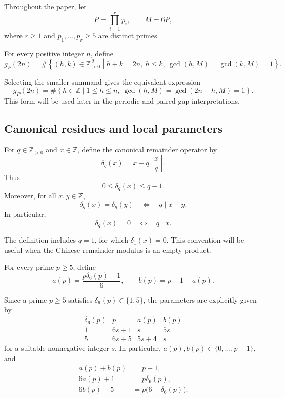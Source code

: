 \documentclass[12pt]{article}
\numberwithin{equation}{section}
\theoremstyle{definition}
\theoremstyle{remark}
\newcommand{\Z}{\mathbb Z}
\begin{document}
Throughout the paper, let
\[
P=\prod_{i=1}^{r}p_i,
\qquad
M=6P,
\]
where $r\geq1$ and $p_1,\dots,p_r\geq5$ are distinct primes.

For every positive integer $n$, define
\begin{equation}
\label{eq:g-definition}
g_P(2n)
=
\#\left\{
(h,k)\in\Z_{>0}^{\,2}
\mathrel{}\middle|\mathrel{}
h+k=2n,\ 
h\leq k,\ 
\gcd(h,M)=\gcd(k,M)=1
\right\}.
\end{equation}

Selecting the smaller summand gives the equivalent expression
\begin{equation}
\label{eq:g-short-interval}
g_P(2n)
=
\#\left\{
h\in\Z
\mathrel{}\middle|\mathrel{}
1\leq h\leq n,\ 
\gcd(h,M)=\gcd(2n-h,M)=1
\right\}.
\end{equation}
This form will be used later in the periodic and paired-gap
interpretations.

\subsection{Canonical residues and local parameters}

For $q\in\Z_{>0}$ and $x\in\Z$, define the canonical remainder
operator by
\begin{equation}
\label{eq:canonical-delta}
\delta_q(x)
=
x-q\left\lfloor\frac{x}{q}\right\rfloor.
\end{equation}
Thus
\[
0\leq\delta_q(x)\leq q-1.
\]
Moreover, for all $x,y\in\Z$,
\begin{equation}
\label{eq:delta-divisibility}
\delta_q(x)=\delta_q(y)
\quad\Longleftrightarrow\quad
q\mid x-y.
\end{equation}
In particular,
\[
\delta_q(x)=0
\quad\Longleftrightarrow\quad
q\mid x.
\]

The definition includes $q=1$, for which $\delta_1(x)=0$. This
convention will be useful when the Chinese-remainder modulus is
an empty product.

For every prime $p\geq5$, define
\begin{equation}
\label{eq:ab-definition}
a(p)
=
\frac{p\delta_6(p)-1}{6},
\qquad
b(p)
=
p-1-a(p).
\end{equation}

Since a prime $p\geq5$ satisfies
$\delta_6(p)\in\{1,5\}$, the parameters are explicitly given by
\[
\begin{array}{c|c|c|c}
\delta_6(p) & p & a(p) & b(p)\\
\hline
1 & 6s+1 & s & 5s\\
5 & 6s+5 & 5s+4 & s
\end{array}
\]
for a suitable nonnegative integer $s$. In particular,
$a(p),b(p)\in\{0,\dots,p-1\}$, and
\begin{align}
a(p)+b(p)
&=p-1,
\label{eq:ab-identities}
\\
6a(p)+1
&=p\delta_6(p),
\label{eq:a-identity}
\\
6b(p)+5
&=p\bigl(6-\delta_6(p)\bigr).
\label{eq:b-identity}
\end{align}
\end{document}

